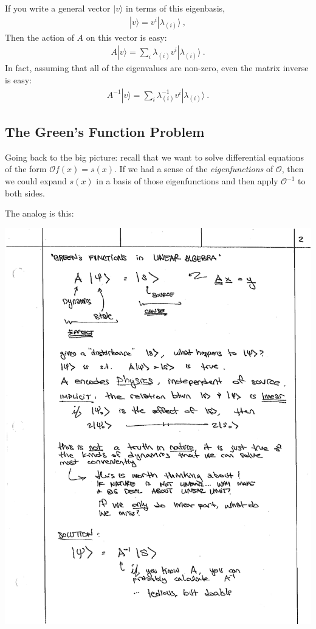 \documentclass[12pt]{article}
\numberwithin{equation}{section}    %
\begin{document}
If you write a general vector $|v\rangle$ in terms of this eigenbasis,
\begin{align}
  |v\rangle = v^i |\lambda_{(i)} \rangle \ ,
\end{align}
Then the action of $A$ on this vector is easy:
\begin{align}
  A |v\rangle = \sum_i \lambda_{(i)} v^i |\lambda_{(i)} \rangle \ .
\end{align}
In fact, assuming that all of the eigenvalues are non-zero, even the matrix inverse is easy:
\begin{align}
  A^{-1}|v\rangle = \sum_i \lambda_{(i)}^{-1} v^i |\lambda_{(i)} \rangle \ .
\end{align}


\subsection{The Green’s Function Problem}

Going back to the big picture: recall that we want to solve differential equations of the form $\mathcal O f(x) = s(x)$. If we had a sense of the \emph{eigenfunctions} of $\mathcal O$, then we could expand $s(x)$ in a basis of those eigenfunctions and then apply $\mathcal O^{-1}$ to both sides. 

The analog is this:

\begin{center}
\includegraphics[width=.7\textwidth]{figures/lec02_green01.pdf}
\end{center}
\end{document}
